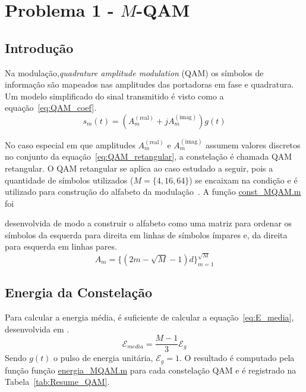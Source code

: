 \section{Problema 1 - \texorpdfstring{$M$}{M}-QAM}

\subsection{Introdução}
Na modulação,\textit{quadrature amplitude modulation} (QAM) os símbolos de informação são mapeados nas amplitudes das portadoras em fase e quadratura. Um modelo simplificado do sinal transmitido é visto como a equação~\ref{eq:QAM_coef}.
\begin{equation}
    s_m(t) = ( A_m^{(\text{real})} + j A_m^{(\text{imag})}) g(t)
    \label{eq:QAM_coef}
\end{equation}

No caso especial em que amplitudes $A_m^{(\text{real})}$ e $A_m^{(\text{imag})}$ assumem valores discretos no conjunto da equação~\ref{eq:QAM_retangular}, a constelação é chamada QAM retangular. O QAM retangular se aplica ao caso estudado a seguir, pois a quantidade de símbolos utilizados ($M = \{4, 16, 64\}$) se encaixam na condição e é utilizado para construção do alfabeto da modulação~\cite{Cecilio}. A função \href{https://raw.githubusercontent.com/lucasabdalah/Courses-HWs/SCD/Sistemas%20de%20Comunicacoes%20Digitais/matlab/problema1/const_MQAM.m}{\colorbox{cyan!10}{const\_MQAM.m}} foi

desenvolvida de modo a construir o alfabeto como uma matriz para ordenar os símbolos da esquerda para direita em linhas de símbolos ímpares e, da direita para esquerda em linhas pares.
\begin{equation}
    A_m = \{(2m -\sqrt{M} - 1)d \}_{m=1}^{\sqrt{M}}
    \label{eq:QAM_retangular}
\end{equation}


\subsection{Energia da Constelação} 
Para calcular a energia média, é suficiente de calcular a equação~\ref{eq:E_media}, desenvolvida em \cite{Cecilio,Proakis}.
\begin{equation}
    \mathcal{E}_{media} = \frac{M-1}{3} \mathcal{E}_g
    \label{eq:E_media}
\end{equation}
Sendo $g(t)$ o pulso de energia unitária, $\mathcal{E}_g = 1$. O resultado é computado pela função função \href{https://raw.githubusercontent.com/lucasabdalah/Courses-HWs/SCD/Sistemas%20de%20Comunicacoes%20Digitais/matlab/problema1/energia_MQAM.m}{\colorbox{cyan!10}{energia\_MQAM.m}} para cada constelação QAM e é registrado na Tabela~\ref{tab:Resume_QAM}.

